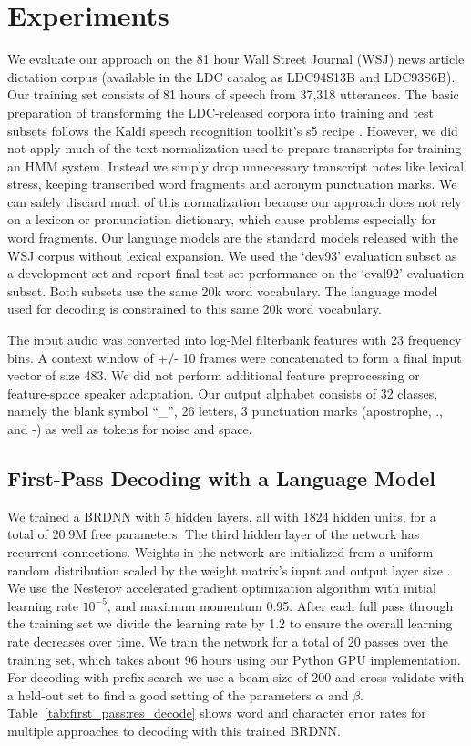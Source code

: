 \section{Experiments}

We evaluate our approach on the 81 hour Wall Street Journal (WSJ) news article
dictation corpus (available in the LDC catalog as LDC94S13B and LDC93S6B). Our
training set consists of 81 hours of speech from 37,318 utterances. The basic
preparation of transforming the LDC-released corpora into training and test
subsets follows the Kaldi speech recognition toolkit's s5 recipe
\cite{povey2011}. However, we did not apply much of the text normalization
used to prepare transcripts for training an HMM system. Instead we simply drop
unnecessary transcript notes like lexical stress, keeping transcribed word
fragments and acronym punctuation marks. We can safely discard much of this
normalization because our approach does not rely on a lexicon or pronunciation
dictionary, which cause problems especially for word fragments. Our language
models are the standard models released with the WSJ corpus without lexical
expansion. We used the `dev93' evaluation subset as a development set and
report final test set performance on the `eval92' evaluation subset. Both
subsets use the same 20k word vocabulary. The language model used for decoding
is constrained to this same 20k word vocabulary.

The input audio was converted into log-Mel filterbank features with 23
frequency bins. A context window of +/- 10 frames were concatenated to form a
final input vector of size 483. We did not perform additional feature
preprocessing or feature-space speaker adaptation.  Our output alphabet
consists of 32 classes, namely the blank symbol ``\_'', 26 letters, 3
punctuation marks (apostrophe, ., and -) as well as tokens for noise and space. 

\subsection{First-Pass Decoding with a Language Model}

We trained a BRDNN with 5 hidden layers, all with 1824 hidden units, for a
total of 20.9M free parameters. The third hidden layer of the network has
recurrent connections. Weights in the network are initialized from a uniform
random distribution scaled by the weight matrix's input and output layer size
\cite{glorot2011}. We use the Nesterov accelerated gradient optimization
algorithm \cite{sutskever2013} with initial learning rate $10^{-5}$, and
maximum momentum 0.95. After each full pass through the training set we divide
the learning rate by 1.2 to ensure the overall learning rate decreases over
time. We train the network for a total of 20 passes over the training set,
which takes about 96 hours using our Python GPU implementation.  For decoding
with prefix search we use a beam size of 200 and cross-validate with a held-out
set to find a good setting of the parameters $\alpha$ and $\beta$.
Table~\ref{tab:first_pass:res_decode} shows word and character error rates for
multiple approaches to decoding with this trained BRDNN.

